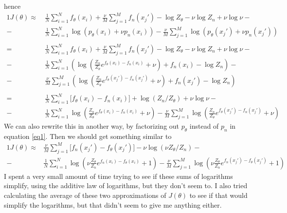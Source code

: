 \documentclass[a4paper]{article}
\begin{document}
hence
\begin{alignat*}{1}
J(\theta) \approx \ &\frac{1}{N} \sum_{i=1}^N  f_\theta(x_i)  + \frac{\nu}{M} \sum_{j=1}^M  f_n(x_j') - \log Z_\theta - \nu \log Z_n + \nu \log \nu-\\
- \ & \frac{1}{N} \sum_{i=1}^N \log( p_\theta(x_i) + \nu p_n(x_i)) - \frac{\nu}{M} \sum_{j=1}^M  \log( p_\theta(x_j') + \nu p_n(x_j')) \\
\\
= \ &\frac{1}{N} \sum_{i=1}^N  f_\theta(x_i)  + \frac{\nu}{M} \sum_{j=1}^M  f_n(x_j') - \log Z_\theta - \nu \log Z_n + \nu \log \nu -\\
- \ & \frac{1}{N} \sum_{i=1}^N \left( \log\left( \frac{Z_n}{Z_\theta} e^{f_\theta(x_i)-f_n(x_i)} + \nu\right) + f_n(x_i) - \log Z_n\right) -\\
- \ & \frac{\nu}{M} \sum_{j=1}^M \left( \log\left( \frac{Z_n}{Z_\theta} e^{f_\theta(x_j')-f_n(x_j')} + \nu\right) + f_n(x_j') - \log Z_n\right)\\
\\
= \ &\frac{1}{N} \sum_{i=1}^N  \big[ f_\theta(x_i) - f_n(x_i)\big]  + \log (Z_n / Z_\theta) + \nu \log \nu -\\
- \ & \frac{1}{N} \sum_{i=1}^N \log\left( \frac{Z_n}{Z_\theta} e^{f_\theta(x_i)-f_n(x_i)} + \nu\right) - \frac{\nu}{M} \sum_{j=1}^M \log\left( \frac{Z_n}{Z_\theta} e^{f_\theta(x_j')-f_n(x_j')} + \nu\right)
\end{alignat*}
We can also rewrite this in another way, by factorizing out $p_\theta$ instead of $p_n$ in equation \eqref{eq1}. Then we should get something similar to
\begin{alignat*}{1}
J(\theta) \approx &\frac{\nu}{M} \sum_{j=1}^M  \big[ f_n(x_j') - f_\theta(x_j')\big]  - \nu \log (\nu Z_\theta / Z_n) -\\
- \ & \frac{1}{N} \sum_{i=1}^N \log\left( \nu \frac{ Z_\theta}{Z_n} e^{f_n(x_i)-f_\theta(x_i)} + 1\right) - \frac{\nu}{M} \sum_{j=1}^M \log\left( \nu\frac{Z_\theta}{Z_n} e^{f_n(x_j')-f_\theta(x_j')} + 1\right)
\end{alignat*}
I spent a very small amount of time trying to see if these sums of logarithms simplify, using the additive law of logarithms, but they don't seem to. I also tried calculating the average of these two approximations of $J(\theta)$ to see if that would simplify the logarithms, but that didn't seem to give me anything either.
\end{document}
